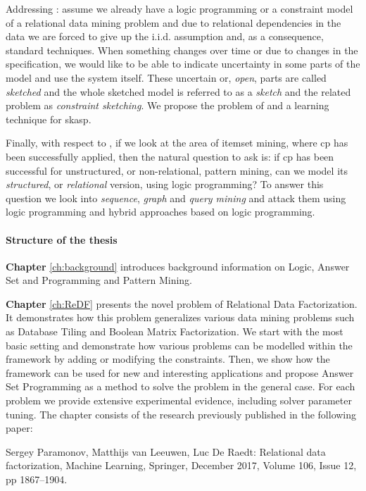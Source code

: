 Addressing \cthree: assume we already have a logic programming or a
constraint model of a relational
data mining problem and due to relational dependencies in the data we are
forced to give up the i.i.d. assumption and, as a consequence,
standard techniques. When something changes over time or due to changes in the specification, we would like
to be able to indicate uncertainty in some parts of the model and use
the system itself. These
uncertain or, \textit{open}, parts are called \textit{sketched} and
the whole sketched model is referred to as a \textit{sketch} and the related
problem as \textit{constraint sketching}. We propose the problem of and
a learning technique for \acrlong{skasp}.


Finally, with respect to \cfour, if we look at the area of itemset mining, where \acrlong{cp}
has been successfully applied, then the natural question to ask is:
if \acrshort{cp} has been successful for unstructured, or
non-relational, pattern mining, can we model its \textit{structured},
or \textit{relational} version, using logic programming? To answer
this question we look into \textit{sequence}, \textit{graph} and
\textit{query mining} and attack them using logic programming and
hybrid approaches based on logic programming.

\paragraph{Structure of the thesis}
\textbf{Chapter} \ref{ch:background} introduces background information
on Logic, Answer Set and Programming and Pattern Mining.

\textbf{Chapter} \ref{ch:ReDF} presents the novel problem of Relational Data
Factorization. It demonstrates how this problem generalizes various
data mining problems such as Database Tiling and Boolean Matrix
Factorization. We start with the most basic setting and demonstrate
how various problems can be modelled within the framework by adding
or modifying the constraints. Then, we show how the framework can be
used for new and interesting applications and propose Answer Set
Programming as a method to solve the problem in the general case.
For each problem we provide extensive experimental evidence,
including solver parameter tuning. The chapter consists of the
research previously published in the following paper:

\begin{addmargin}[2em]{2em}

Sergey Paramonov,  Matthijs van Leeuwen, Luc De Raedt: Relational data
factorization, Machine Learning, Springer, December 2017, Volume 106,
    Issue 12, pp 1867–1904.

\end{addmargin}



